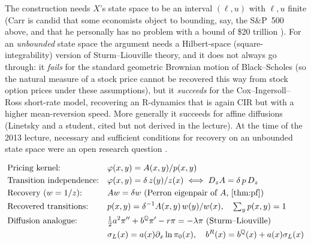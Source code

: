 \begin{paracol}{2}
\begin{coursenote}
The construction needs $X$'s state space to be an interval $(\ell,u)$ with $\ell,u$ finite (Carr is candid
that some economists object to bounding, say, the S\&P~500 above, and that he personally has no problem
with a bound of \$20 trillion ). For an \emph{unbounded} state space the argument needs a
Hilbert-space (square-integrability) version of Sturm--Liouville theory, and it does not always go through:
it \emph{fails} for the standard geometric Brownian motion of Black--Scholes (so the natural measure of a
stock price cannot be recovered this way from stock option prices under these assumptions), but it
\emph{succeeds} for the Cox--Ingersoll--Ross short-rate model, recovering an R-dynamics that is again CIR
but with a higher mean-reversion speed. More generally it succeeds for affine diffusions (Linetsky and a
student, cited but not derived in the lecture). At the time of the 2013 lecture, necessary and sufficient
conditions for recovery on an unbounded state space were an open research question
.
\end{coursenote}

\begin{keyformulas}
\begin{align*}
&\text{Pricing kernel:} && \varphi(x,y)=A(x,y)/p(x,y)\\
&\text{Transition independence:} && \varphi(x,y)=\delta\,z(y)/z(x)\iff D_zA=\delta\,p\,D_z\\
&\text{Recovery ($w=1/z$):} && Aw=\delta w \ \text{(Perron eigenpair of }A\text{, \cref{thm:pf})}\\
&\text{Recovered transitions:} && p(x,y)=\delta^{-1}A(x,y)\,w(y)/w(x),\quad\textstyle\sum_yp(x,y)=1\\
&\text{Diffusion analogue:} && \tfrac12a^2\pi''+b^\Q\pi'-r\pi=-\lambda\pi\ \text{(Sturm--Liouville)}\\
  &&& \sigma_L(x)=a(x)\partial_x\ln\pi_0(x),\quad b^R(x)=b^\Q(x)+a(x)\sigma_L(x)
\end{align*}
\end{keyformulas}


\end{paracol}
